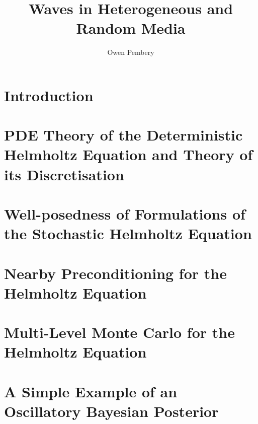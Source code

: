 \documentclass{report}
\title{Waves in Heterogeneous and Random Media}
\author{Owen Pembery}
\begin{document}
\maketitle

\chapter{Introduction}\label{chap:intro}


\chapter{PDE Theory of the Deterministic Helmholtz Equation and Theory of its Discretisation}\label{chap:background}


\chapter{Well-posedness of Formulations of the Stochastic Helmholtz Equation}\label{chap:stochastic}

\chapter{Nearby Preconditioning for the Helmholtz Equation}\label{chap:nbpc}

\chapter{Multi-Level Monte Carlo for the Helmholtz Equation}\label{chap:mlmc}

\appendix

\chapter{A Simple Example of an Oscillatory Bayesian Posterior}\label{app:osc}




\end{document}

